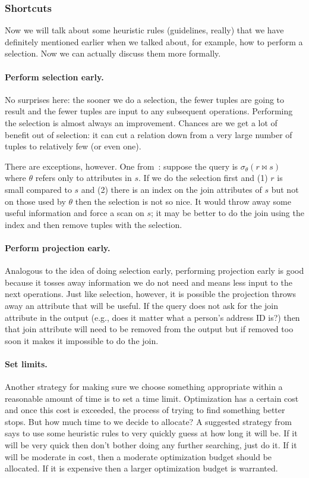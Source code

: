 \documentclass[a4paper]{report}
\begin{document}
\subsubsection*{Shortcuts}

Now we will talk about some heuristic rules (guidelines, really) that we have definitely mentioned earlier when we talked about, for example, how to perform a selection. Now we can actually discuss them more formally.

\paragraph{Perform selection early.} No surprises here: the sooner we do a selection, the fewer tuples are going to result and the fewer tuples are input to any subsequent operations. Performing the selection is almost always an improvement. Chances are we get a lot of benefit out of selection: it can cut a relation down from a very large number of tuples to relatively few (or even one). 

There are exceptions, however. One from~\cite{dsc}: suppose the query is $\sigma_{\theta}( r \bowtie s )$ where $\theta$ refers only to attributes in $s$. If we do the selection first and (1) $r$ is small compared to $s$ and (2) there is an index on the join attributes of $s$ but not on those used by $\theta$ then the selection is not so nice. It would throw away some useful information and force a scan on $s$; it may be better to do the join using the index and then remove tuples with the selection.

\paragraph{Perform projection early.} Analogous to the idea of doing selection early, performing projection early is good because it tosses away information we do not need and means less input to the next operations. Just like selection, however, it is possible the projection throws away an attribute that will be useful. If the query does not ask for the join attribute in the output (e.g., does it matter what a person's address ID is?) then that join attribute will need to be removed from the output but if removed too soon it makes it impossible to do the join.

\paragraph{Set limits.} Another strategy for making sure we choose something appropriate within a reasonable amount of time is to set a time limit. Optimization has a certain cost and once this cost is exceeded, the process of trying to find something better stops. But how much time to we decide to allocate? A suggested strategy from~\cite{dsc} says to use some heuristic rules to very quickly guess at how long it will be. If it will be very quick then don't bother doing any further searching, just do it. If it will be moderate in cost, then a moderate optimization budget should be allocated. If it is expensive then a larger optimization budget is warranted.
\end{document}
